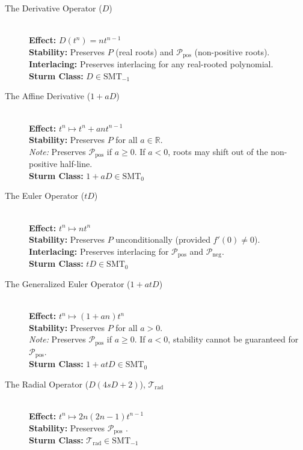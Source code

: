 \documentclass[11pt]{article}
\theoremstyle{breakdef}
\begin{document}
\begin{description}
    \item[The Derivative Operator ($D$)] \hfill \\
    \textbf{Effect:} $D(t^n) = n t^{n-1}$ \\
    \textbf{Stability:} Preserves $P$ (real roots) and $\mathcal{P_{\mathrm{pos}}}$ (non-positive roots). \\
    \textbf{Interlacing:} Preserves interlacing for any real-rooted polynomial. \\
    \textbf{Sturm Class:} $D\in\mathrm{SMT}_{-1}$


    \item[The Affine Derivative ($1 + aD$)] \hfill \\
    \textbf{Effect:} $t^n \mapsto t^n + a n t^{n-1}$ \\
    \textbf{Stability:} Preserves $P$ for all $a \in \mathbb{R}$. \\
    \textit{Note:} Preserves $\mathcal{P_{\mathrm{pos}}}$ if $a \ge 0$. If $a < 0$, roots may shift out of the non-positive half-line. \\
    \textbf{Sturm Class:} $1 + aD \in\mathrm{SMT}_{0}$


    \item[The Euler Operator ($tD$)] \hfill \\
    \textbf{Effect:} $t^n \mapsto n t^n$ \\
    \textbf{Stability:} Preserves $P$ unconditionally (provided $f'(0) \neq 0$). \\
    \textbf{Interlacing:} Preserves interlacing for $\mathcal{P_{\mathrm{pos}}}$ and $\mathcal{P_{\mathrm{neg}}}$. \\
    \textbf{Sturm Class:} $tD\in\mathrm{SMT}_{0}$


    \item[The Generalized Euler Operator ($1 + a tD$)] \hfill \\
    \textbf{Effect:} $t^n \mapsto (1 + a n)t^n$ \\
    \textbf{Stability:} Preserves $P$ for all $a > 0$. \\
    \textit{Note:} Preserves $\mathcal{P}_{\mathrm{pos}}$ if $a \ge 0$. If $a < 0$, stability cannot be guaranteed for $\mathcal{P}_{\mathrm{pos}}$. \\
        \textbf{Sturm Class:} $1 + a tD \in\mathrm{SMT}_{0}$


   \item[The Radial Operator ($ D(4sD + 2)$), $\mathcal{T}_{\text{rad}}$] \hfill \\
    \textbf{Effect:} $t^n \mapsto 2 n (2 n-1) t^{n-1} $ \\
    \textbf{Stability:} Preserves $\mathcal{P}_{\mathrm{pos}}$ . \\
    \textbf{Sturm Class:} $\mathcal{T}_{\text{rad}} \in \mathrm{SMT}_{-1}$


\end{description}
\end{document}
